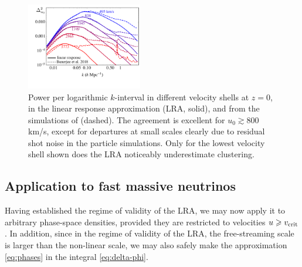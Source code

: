 \documentclass[useAMS, usenatbib]{mnras}
\newcommand{\spb}[1]{{\textcolor{green}{[{\bf SPB}: #1]}}}
\begin{document}
\begin{figure}
  \includegraphics[width=0.45\textwidth]{nuplots/banerjee_lin_resp.pdf}
  \caption{Power per logarithmic $k$-interval in different velocity shells at $z = 0$, in the linear response approximation (LRA, solid), and from the simulations of \protect \cite{Banerjee_2018} (dashed). The agreement is excellent for $u_0 \gtrsim 800$ km/s, except for departures at small scales clearly due to residual shot noise in the particle simulations. Only for the lowest velocity shell shown does the LRA noticeably underestimate clustering.
  }
  \label{fig:simvshell}
\end{figure}


\subsection{Application to fast massive neutrinos}

Having established the regime of validity of the LRA, we may now apply it to arbitrary phase-space densities, provided they are restricted to velocities $u \geq v_{\rm crit}$. In addition, since in the regime of validity of the LRA, the free-streaming scale is larger than the non-linear scale, we may also safely make the approximation \eqref{eq:phases} in the integral \eqref{eq:delta-phi}.
\end{document}
